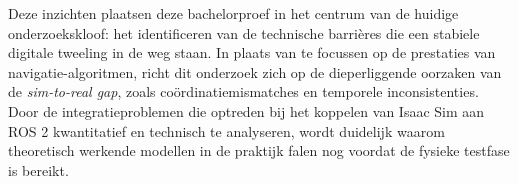 Deze inzichten plaatsen deze bachelorproef in het centrum van de huidige onderzoekskloof: het identificeren van de technische barrières die een stabiele digitale tweeling in de weg staan. In plaats van te focussen op de prestaties van navigatie-algoritmen, richt dit onderzoek zich op de dieperliggende oorzaken van de \textit{sim-to-real gap}, zoals coördinatiemismatches en temporele inconsistenties. Door de integratieproblemen die optreden bij het koppelen van Isaac Sim aan ROS 2 kwantitatief en technisch te analyseren, wordt duidelijk waarom theoretisch werkende modellen in de praktijk falen nog voordat de fysieke testfase is bereikt.





